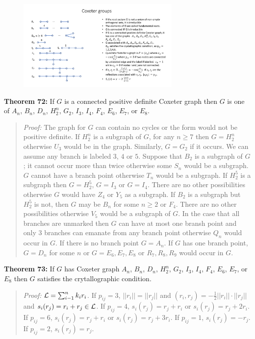 \begin{figure}
\center
\includegraphics[natwidth=642, natheight=610, width=80mm]{dynkin.pdf}
\end{figure}
{\bf Theorem 72:}
If $G$ is a connected positive definite Coxeter graph then $G$ is one of
$A_n$,
$B_n$,
$D_n$,
$H_2^n$,
$G_2$,
$I_3$,
$I_4$,
$F_4$,
$E_6$,
$E_7$, or
$E_8$.
\begin{quote}
\emph{Proof:}  
The graph for $G$ can contain no cycles or the form would not be positive definite.
If $H_2^n$ is a subgraph of $G$, for any $n \ge 7$ then $G= H_2^n$ otherwise
$U_3$  would be in the graph.  Similarly, $G= G_2$ if it occurs.
We can assume any branch is labeled $3$, $4$ or $5$.  Suppose that $B_2$
is a subgraph of $G$; it cannot occur more than twice otherwise some $S_n$
would be a subgraph.  $G$ cannot have a branch point otherwise $T_n$ would be
a subgraph.  If $H_2^5$ is a subgraph then $G= H_2^5$, $G= I_3$ or
$G= I_4$.  There are no other possibilities otherwise $G$ would have $Z_4$
or $Y_5$ as a subgraph.  If $B_2$ is a subgraph but $H_2^5$ is not, then
$G$ may be $B_n$ for some $n \ge 2$ or $F_4$.  There are no other possibilities
otherwise $V_5$ would be a subgraph of $G$.  In the case that all branches are unmarked
then $G$ can have at most one bransh point and only $3$ branches can emanate from any branch point
otherwise $Q_n$ would occur in $G$.  If there is no branch point $G= A_n$.  If $G$
has one branch point, $G= D_n$ for some $n$ or $G= E_6, E_7, E_8$ or $R_7, R_8, R_9$ would
occur in $G$.
\end{quote}
{\bf Theorem 73:}
If $G$ has Coxeter graph
$A_n$, $B_n$, $D_n$, $H_2^n$,
$G_2$, $I_3$, $I_4$, $F_4$,
$E_6$, $E_7$, or
$E_8$ then $G$ satisfies the crytallographic condition.
\begin{quote}
\emph{Proof:}  
${\cal L} = \sum_{i-1}^n k_i r_i$.  If $p_{ij}= 3$, $||r_i||= ||r_j||$ and
$(r_i , r_j ) = - {\frac 1 2} ||r_i|| \cdot ||r_j||$ and $s_i(r_j)= r_i + r_j \in {\cal L}$.
If $p_{ij}= 4$, $s_i(r_j)= r_j + r_i$ or $s_i(r_j)= r_j + 2r_i$.
If $p_{ij}= 6$, $s_i(r_j)= r_j + r_i$ or $s_i(r_j)= r_j + 3r_i$.
If $p_{ij}= 1$, $s_i(r_j)= - r_j$.
If $p_{ij}= 2$, $s_i(r_j)= r_j$.
\end{quote}
